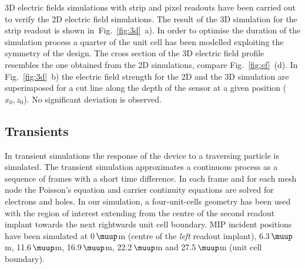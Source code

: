 \documentclass[a4paper,11pt]{article}
\begin{document}
3D electric fields simulations with strip and pixel readouts have been carried out to verify the 2D electric field simulations.
The result of the 3D simulation for the strip readout is shown in~Fig.~\ref{fig:3d}~a).
In order to optimise the duration of the simulation process a quarter of the unit cell has been modelled exploiting the symmetry of the design.
The cross section of the 3D electric field profile resembles the one obtained from the 2D simulations, compare Fig.~\ref{fig:ef}~(d). 
In Fig.~\ref{fig:3d}~b) the electric field strength for the 2D and the 3D simulation are superimposed for a cut line along the depth of the sensor at a given position ($x_0,z_0$). 
No significant deviation is observed.


\subsection{Transients}
\label{sec:tr}
In transient simulations the response of the device to a traversing particle is simulated. 
The transient simulation approximates a continuous process as a sequence of frames with a short time difference. 
In each frame and for each mesh node the Poisson's equation and carrier continuity equations are solved for electrons and holes.
In our simulation, a four-unit-cells geometry has been used with the region of interest extending from the centre of the second readout implant towards the next rightwards unit cell boundary.  
MIP incident positions have been simulated at 0\,$\muup$m (centre of the \textit{left} readout implant), 6.3\,$\muup$m, 11.6\,$\muup$m, 16.9\,$\muup$m, 22.2\,$\muup$m and 27.5\,$\muup$m (unit cell boundary).
\end{document}
